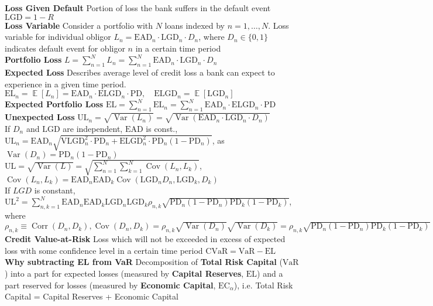 \documentclass[12pt,landscape, a4paper]{article}
\theoremstyle{remark}
\newcommand{\var}{\operatorname{Var}}
\newcommand{\E}{\operatorname{\mathbb{E}}}
\newcommand{\cov}{\operatorname{Cov}}
\newcommand{\VaR}{\mathrm{VaR}}
\newcommand{\CVaR}{\mathrm{CVaR}}
\newcommand{\EL}{\mathrm{EL}}
\newcommand{\PD}{\mathrm{PD}}
\newcommand{\EAD}{\mathrm{EAD}}
\newcommand{\LGD}{\mathrm{LGD}}
\newcommand{\corr}{\operatorname{Corr}}
\begin{document}
\begin{multicols*}{3}
\textbf{Loss Given Default} Portion of loss the bank suffers in the default event $\mathrm{LGD} = 1 - R$\\

\textbf{Loss Variable} Consider a portfolio with $N$ loans indexed by $n = 1, \dots, N$. Loss variable for individual obligor $L_n = \EAD_n \cdot \LGD_n \cdot D_n$, where $D_n \in \{0, 1\}$ indicates default event for obligor $n$ in a certain time period\\
\textbf{Portfolio Loss} $L = \sum^N_{n=1} L_n = \sum^N_{n=1}  \EAD_n \cdot \LGD_n \cdot D_n$\\

\textbf{Expected Loss} Describes average level of credit loss a bank can expect to experience in a given time period. $\mathrm{EL}_n = \E [L_n] =  \EAD_n \cdot \mathrm{ELGD}_n \cdot \PD,\quad \mathrm{ELGD}_n = \E [\LGD_n]$\\

\textbf{Expected Portfolio Loss} $\mathrm{EL} = \sum^N_{n=1} \mathrm{EL}_n = \sum^N_{n=1} \EAD_n \cdot \mathrm{ELGD}_n \cdot \PD $\\

\textbf{Unexpected Loss} $\mathrm{UL}_n = \sqrt{\var (L_n)} = \sqrt{\var (\EAD_n \cdot \LGD_n \cdot D_n)}$\\
If $D_n$ and $\LGD$ are independent, $\EAD$ is const., $\mathrm{UL}_n = \EAD_n \sqrt{\mathrm{VLGD}_n^2 \cdot \PD_n + \mathrm{ELGD}^2_n \cdot \PD_n (1-\PD_n)}$, as $\var (D_n) = \PD_n (1-\PD_n)$\\

$\mathrm{UL} = \sqrt{\var (L)} = \sqrt{\sum^N_{n=1} \sum^N_{k=1} \cov (L_n, L_k) }$, $\cov (L_n, L_k) = \EAD_n \EAD_k \cov(\LGD_n D_n, \LGD_k, D_k)$\\
If $LGD$ is constant, $\mathrm{UL}^2 = \sum^N_{n, k=1} \EAD_n \EAD_k \LGD_n \LGD_k \rho_{n, k} \sqrt{\PD_n (1-\PD_n) \PD_k (1-\PD_k)}$, where $\rho_{n, k} \equiv \corr (D_n, D_k), \cov(D_n, D_k) = \rho_{n, k} \sqrt{\var (D_n)} \sqrt{\var (D_k)} = \rho_{n, k} \sqrt{\PD_n (1-\PD_n) \PD_k (1-\PD_k)}$\\

\textbf{Credit Value-at-Risk} Loss which will not be exceeded in excess of expected loss with some confidence level in a certain time period $\CVaR = \VaR - \EL$\\

\textbf{Why subtracting EL from VaR} Decomposition of \textbf{Total Risk Capital} ($\VaR$) into a part for expected losses (measured by \textbf{Capital Reserves}, $\EL$) and a part reserved for losses (measured by \textbf{Economic Capital}, $\mathrm{EC}_\alpha$), i.e. Total Risk Capital = Capital Reserves + Economic Capital\\


\end{multicols*}
\end{document}
